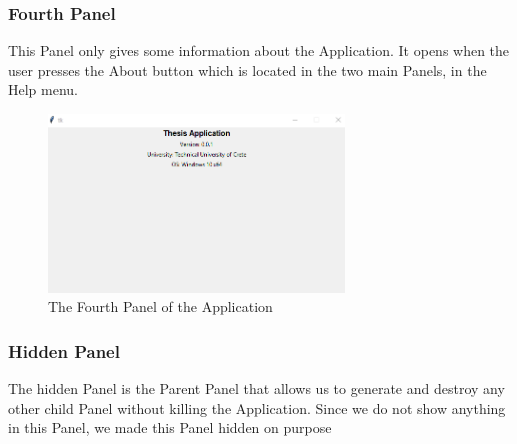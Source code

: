 \subsubsection*{Fourth Panel}
This Panel only gives some information about the Application. It opens when the user presses the About button which is located in the two main Panels, in the Help menu. 

\begin{figure}[h]
	\centering
	\includegraphics[width=0.7\textwidth]{figures/Implementation/Panel4.png}
	\captionsetup{labelformat=empty}
	\caption{The Fourth Panel of the Application}
\end{figure}

\subsubsection*{Hidden Panel}
The hidden Panel is the Parent Panel that allows us to generate and destroy any other child Panel without killing the Application. Since we do not show anything in this Panel, we made this Panel hidden on purpose